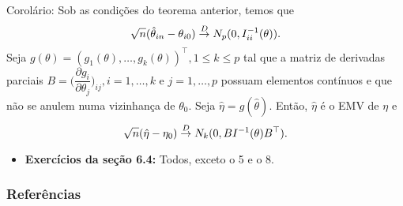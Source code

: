\documentclass[12pt]{beamer}
\begin{document}
\begin{frame}{}
\begin{block}{Corolário:}
\justifying
Sob as condições do teorema anterior, temos que $$\sqrt{n}(\hat{\theta}_{in}-\theta_{i0})\overset{D}{\rightarrow} N_{p}(0,I_{ii}^{-1}(\theta)).$$
Seja $g(\theta)=(g_{1}(\theta),\ldots,g_{k}(\theta))^{\top},1\leq k\leq p$ tal que a matriz de derivadas parciais $B=\Big(\dfrac{\partial g_{i}}{\partial \theta_{j}}\Big)_{ij}, i=1,\ldots,k$ e $j=1,\ldots,p$ possuam elementos contínuos e que não se anulem numa vizinhança de $\theta_{0}.$ Seja $\hat{\eta}=g(\hat{\theta}).$ Então, $\hat{\eta}$ é o EMV de $\eta$ e $$\sqrt{n}(\hat{\eta}-\eta_{0})\overset{D}{\rightarrow} N_{k}(0,BI^{-1}(\theta)B^{\top}).$$
\end{block}
\end{frame}


\begin{frame}{}
\begin{block}{\Home}
\justifying
\begin{itemize}
    \item \textbf{Exercícios da seção 6.4:} Todos, exceto o 5 e o 8.
\end{itemize}
\nocite{hogg, casella2021statistical, bolfarine}
\end{block}
\end{frame}

\begin{frame}[allowframebreaks]
\frametitle{\bf Referências}
\printbibliography
\end{frame}
\end{document}
